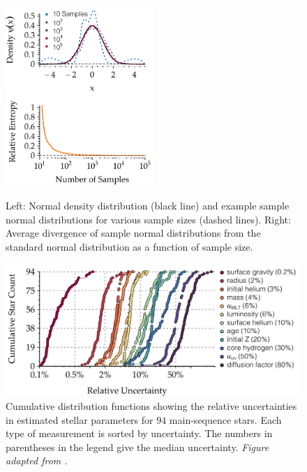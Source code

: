\begin{figure}
    \centering
    \includegraphics[width=0.5\textwidth]{figs/evol/norm.pdf}%
    \includegraphics[width=0.5\textwidth]{figs/evol/KL.pdf}
    \caption[Relative entropy of sample normal distributions]{Left: Normal density distribution (black line) and example sample normal distributions for various sample sizes (dashed lines). 
    Right: Average divergence of sample normal distributions from the standard normal distribution as a function of sample size. 
    \label{fig:kl}}
\end{figure}

\begin{figure}
    \includegraphics[width=\textwidth]{figs/pulse/cdf.pdf}
    \caption[Relative uncertainties in estimated stellar parameters]{Cumulative distribution functions showing the relative uncertainties in estimated stellar parameters for $94$ main-sequence stars. 
    Each type of measurement is sorted by uncertainty. 
    The numbers in parentheses in the legend give the median uncertainty. 
    \emph{Figure adapted from \citealt{2017EPJWC.16005003B}.}
    \label{fig:posterior-cdf}}
\end{figure}



